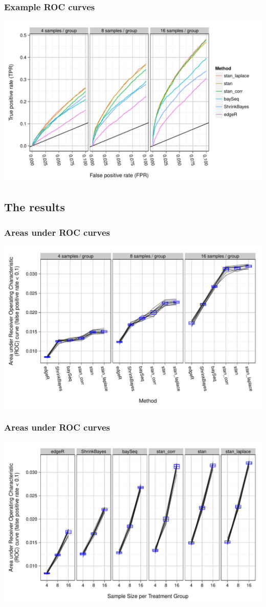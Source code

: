 \documentclass[handout]{beamer}
\numberwithin{equation}{section}
\begin{document}
\begin{frame}
\frametitle{Example ROC curves}
\begin{center}
\includegraphics[scale=0.5]{roc}
\end{center}
\end{frame}



\subsection{The results}

\begin{frame}
\frametitle{Areas under ROC curves}
\begin{center}
\includegraphics[scale=0.5]{auc1}
\end{center}
\end{frame}

\begin{frame}
\frametitle{Areas under ROC curves}
\begin{center}
\includegraphics[scale=0.5]{auc2}
\end{center}
\end{frame}
\end{document}
